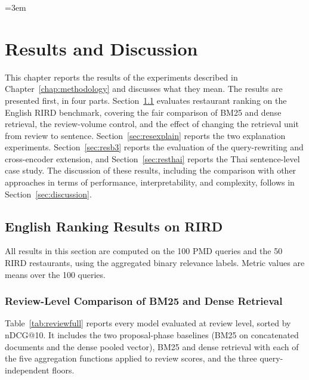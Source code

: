 \providecommand{\mpnet}{\texttt{paraphrase-\allowbreak multilingual-\allowbreak mpnet-\allowbreak base-\allowbreak v2}}
\providecommand{\cemodel}{\texttt{ms-marco-\allowbreak MiniLM-\allowbreak L-6-\allowbreak v2}}
\emergencystretch=3em
\providecommand{\pending}[1]{\textbf{[PENDING: #1]}}

\chapter{Results and Discussion}
\label{chap:results}

This chapter reports the results of the experiments described in Chapter~\ref{chap:methodology} and discusses what they mean. The results are presented first, in four parts. Section~\ref{sec:resenglish} evaluates restaurant ranking on the English RIRD benchmark, covering the fair comparison of BM25 and dense retrieval, the review-volume control, and the effect of changing the retrieval unit from review to sentence. Section~\ref{sec:resexplain} reports the two explanation experiments. Section~\ref{sec:resb3} reports the evaluation of the query-rewriting and cross-encoder extension, and Section~\ref{sec:resthai} reports the Thai sentence-level case study. The discussion of these results, including the comparison with other approaches in terms of performance, interpretability, and complexity, follows in Section~\ref{sec:discussion}.

\section{English Ranking Results on RIRD}
\label{sec:resenglish}

All results in this section are computed on the 100 PMD queries and the 50 RIRD restaurants, using the aggregated binary relevance labels. Metric values are means over the 100 queries.

\subsection{Review-Level Comparison of BM25 and Dense Retrieval}
\label{sec:resreview}

Table~\ref{tab:reviewfull} reports every model evaluated at review level, sorted by nDCG@10. It includes the two proposal-phase baselines (BM25 on concatenated documents and the dense pooled vector), BM25 and dense retrieval with each of the five aggregation functions applied to review scores, and the three query-independent floors.

